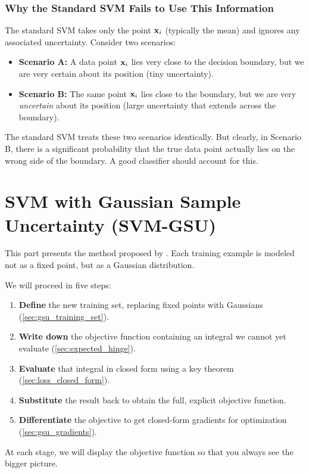 \documentclass[11pt, letterpaper]{article}
\begin{document}
\section{Why the Standard SVM Fails to Use This Information}

The standard SVM takes only the point $\vb{x}_i$ (typically the mean) and ignores any associated uncertainty. Consider two scenarios:
\begin{itemize}[leftmargin=2em]
    \item \textbf{Scenario A:} A data point $\vb{x}_i$ lies very close to the decision boundary, but we are very certain about its position (tiny uncertainty).
    \item \textbf{Scenario B:} The same point $\vb{x}_i$ lies close to the boundary, but we are very \emph{uncertain} about its position (large uncertainty that extends across the boundary).
\end{itemize}
The standard SVM treats these two scenarios identically. But clearly, in Scenario B, there is a significant probability that the true data point actually lies on the wrong side of the boundary. A good classifier should account for this.


\part{SVM with Gaussian Sample Uncertainty (SVM-GSU)}

This part presents the method proposed by \textcite{tzelepis2017linear}. Each training example is modeled not as a fixed point, but as a Gaussian distribution.

\medskip
\begin{statusbox}
We will proceed in five steps:
\begin{enumerate}[leftmargin=1.5em, topsep=2pt, itemsep=1pt]
    \item \textbf{Define} the new training set, replacing fixed points with Gaussians (\cref{sec:gsu_training_set}).
    \item \textbf{Write down} the objective function containing an integral we cannot yet evaluate (\cref{sec:expected_hinge}).
    \item \textbf{Evaluate} that integral in closed form using a key theorem (\cref{sec:loss_closed_form}).
    \item \textbf{Substitute} the result back to obtain the full, explicit objective function.
    \item \textbf{Differentiate} the objective to get closed-form gradients for optimization (\cref{sec:gsu_gradients}).
\end{enumerate}
At each stage, we will display the objective function so that you always see the bigger picture.
\end{statusbox}
\end{document}
